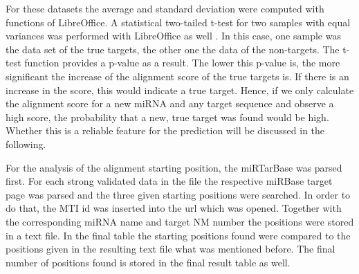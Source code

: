 \documentclass[12pt]{article}
\begin{document}
For these datasets the average and standard deviation were computed with functions of LibreOffice. A statistical two-tailed t-test for two samples with equal variances was performed with LibreOffice as well \cite{ttest}. In this case, one sample was the data set of the true targets, the other one the data of the non-targets. The t-test function provides a p-value as a result. The lower this p-value is, the more significant the increase of the alignment score of the true targets is. If there is an increase in the score, this would indicate a true target. Hence, if we only calculate the alignment score for a new miRNA and any target sequence and observe a high score, the probability that a new, true target was found would be high. Whether this is a reliable feature for the prediction will be discussed in the following.

For the analysis of the alignment starting position, the miRTarBase was parsed first. For each strong validated data in the file the respective miRBase target page was parsed and the three given starting positions were searched. In order to do that, the MTI id was inserted into the url which was opened. Together with the corresponding miRNA name and target NM number the positions were stored in a text file. In the final table the starting positions found were compared to the positions given in the resulting text file what was mentioned before. The final number of positions found is stored in the final result table as well. 



\vspace{1cm}
\end{document}
